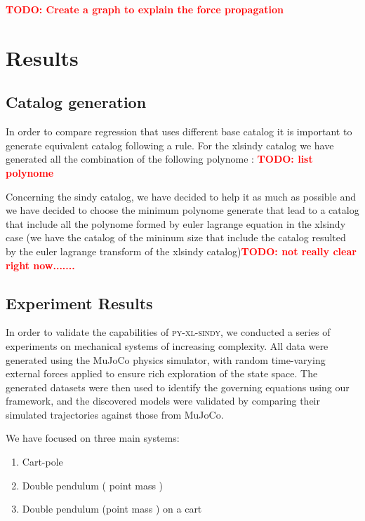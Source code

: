 \documentclass[12pt]{article}
\newcommand{\frameworkname}{\textsc{py-xl-sindy}}
\newcommand{\TODO}[1]{\textbf{\textcolor{red}{\Large TODO: \normalsize #1}}}
\begin{document}
\TODO{Create a graph to explain the force propagation}

\section*{Results}

\subsection*{Catalog generation}

In order to compare regression that uses different base catalog it is important to generate equivalent catalog following a rule. For the xlsindy catalog we have generated all the combination of the following polynome : 
\TODO{list polynome}

Concerning the sindy catalog, we have decided to help it as much as possible and we have decided to choose the minimum polynome generate that lead to a catalog that include all the polynome formed by euler lagrange equation in the xlsindy case (we have the catalog of the mininum size that include the catalog resulted by the euler lagrange transform of the xlsindy catalog)\TODO{not really clear right now.......}

\subsection*{Experiment Results}

In order to validate the capabilities of \frameworkname, we conducted a series of experiments on mechanical systems of increasing complexity. All data were generated using the MuJoCo physics simulator, with random time-varying external forces applied to ensure rich exploration of the state space. The generated datasets were then used to identify the governing equations using our framework, and the discovered models were validated by comparing their simulated trajectories against those from MuJoCo.

We have focused on three main systems:
\begin{enumerate}
	\item Cart-pole
	\item Double pendulum ( point mass )
	\item Double pendulum (point mass ) on a cart
\end{enumerate}
\end{document}
